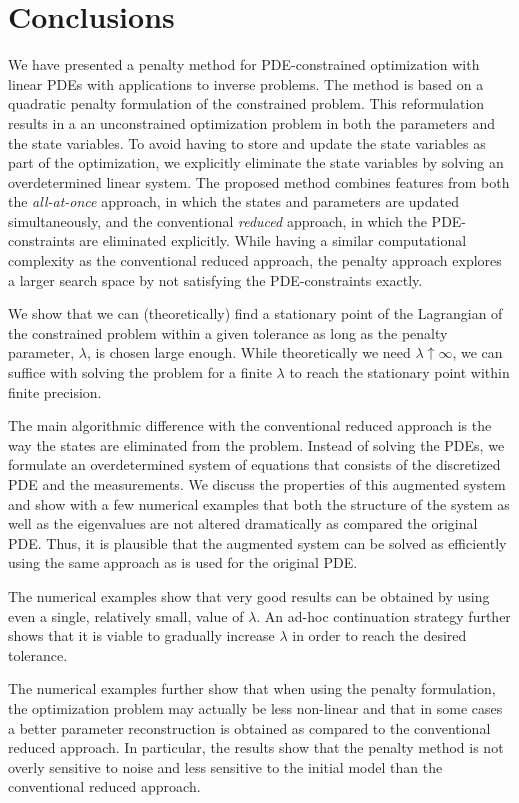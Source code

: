 \documentclass{iopart}
\begin{document}
\section{Conclusions}
\label{conclusion}
We have presented a penalty method for PDE-constrained optimization with linear PDEs with applications to inverse problems. The method is based on a quadratic penalty formulation of the constrained problem. This reformulation results in a an unconstrained optimization problem in both the parameters and the state variables. To avoid having to store and update the state variables as part of the optimization, we explicitly eliminate
the state variables by solving an overdetermined linear system. The proposed method combines features from both the \emph{all-at-once} approach, in which the states and parameters are updated simultaneously, and the conventional \emph{reduced} approach, in which the PDE-constraints are eliminated explicitly. While having a similar computational complexity as the conventional reduced approach, the penalty approach explores a larger search space by not satisfying the PDE-constraints exactly. 

We show that we can (theoretically) find a stationary point of the Lagrangian of the constrained problem within a given tolerance as long as the penalty parameter, $\lambda$, is chosen large enough. While theoretically we need $\lambda \uparrow \infty$, we can suffice with solving the problem for a finite $\lambda$ to reach the stationary point within finite precision. 

The main algorithmic difference with the conventional reduced approach is the way the states are eliminated from the problem. Instead of solving the PDEs, we formulate an overdetermined system of equations that consists of the discretized PDE and the measurements. We discuss the properties of this augmented system and show with a few numerical examples that both the structure of the system as well as the eigenvalues are not altered dramatically as compared the original PDE. Thus, it is plausible that the augmented system can be solved as efficiently using the same approach as is used for the original PDE.

The numerical examples show that very good results can be obtained by using even a single, relatively small, value of $\lambda$. An ad-hoc continuation strategy further shows that it is viable to gradually increase $\lambda$ in order to reach the desired tolerance.

The numerical examples further show that when using the penalty formulation, the optimization problem may actually be less non-linear and that in some cases a better parameter reconstruction is obtained as compared to the conventional reduced approach. In particular, the results show that the penalty method is not overly sensitive to noise and less sensitive to the initial model than the conventional reduced approach. 
\end{document}
